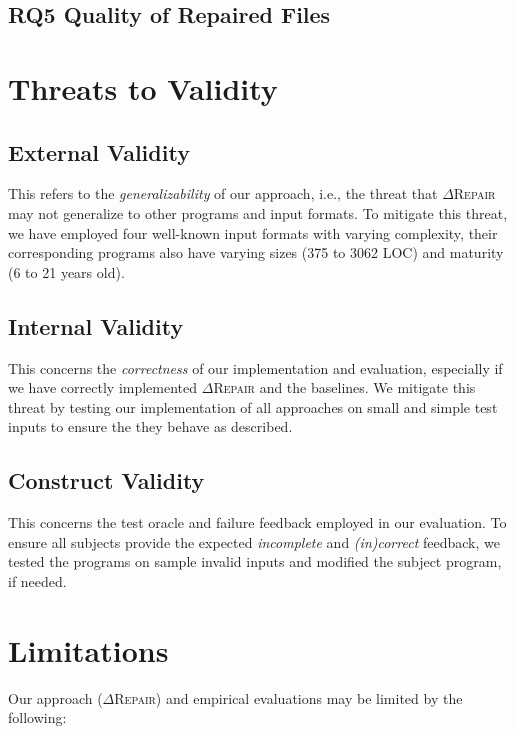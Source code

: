 \documentclass[acmsmall,screen,review,anonymous]{acmart}
\newcounter{todocounter}
\newcommand{\todo}[1]{\marginpar{$|$}\textcolor{red}{\stepcounter{todocounter}\footnote[\thetodocounter]{\textcolor{red}{\textbf{TODO }}\textit{#1}}}}
\renewcommand{\todo}[1]{}
\newcommand{\approach}{\textsc{$\Delta$Repair}\xspace}
\begin{document}
\subsection{RQ5 Quality of Repaired Files}
\todo{EZ: Write RQ5}

\section{Threats to Validity}
\label{sec:threats}

\todo{EZ: Add Rich Feedback Oracle problem to threats (the approach very much relies on reliable oracles and even one small faulty feedback might make the whole input unrepairable)}




\subsection{External Validity} This refers to the \textit{generalizability} of our approach, i.e., 
the threat that \approach may not generalize to other programs and input formats. 
To mitigate this threat, we have employed four well-known input formats with varying complexity, their corresponding programs also have  varying sizes (375 to 3062 LOC) and maturity (6 to 21 years old). 


\subsection{Internal Validity} This concerns the \textit{correctness} of our implementation and evaluation, especially if we have correctly implemented \approach and the baselines. We mitigate this threat by testing our implementation of all approaches on small and simple test inputs to ensure the they behave as described. 


\subsection{Construct Validity} This concerns the test oracle and failure feedback employed in our evaluation. To ensure all subjects provide the expected \textit{incomplete} and \textit{(in)correct} feedback, we tested the programs on sample invalid inputs and modified the subject program, if needed. 


\section{Limitations}
Our approach (\approach) and empirical evaluations may be limited by the following: %
\end{document}
